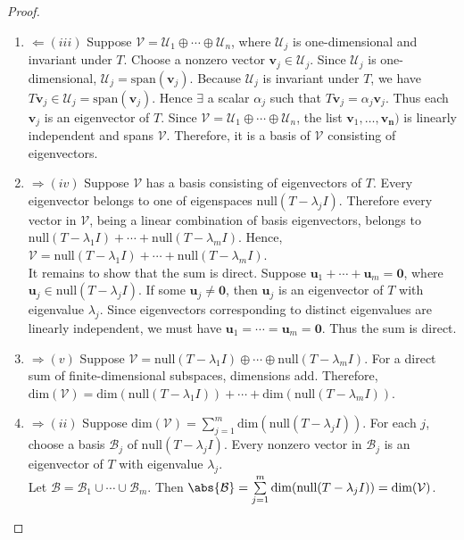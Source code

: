 \begin{proposition}
\begin{proof}
\begin{enumerate}[label=\roman*.]
\item[$(ii)$]$\Leftarrow (iii)$ Suppose $\mathcal{V} = \mathcal{U}_1 \oplus \cdots \oplus \mathcal{U}_n$, where $\mathcal{U}_j$ is one-dimensional and invariant under $T$. Choose a nonzero vector $\mathbf{v}_j \in \mathcal{U}_j$. Since $\mathcal{U}_j$ is one-dimensional, $\mathcal{U}_j = \text{span}(\mathbf{v}_j)$. Because $\mathcal{U}_j$ is invariant under $T$, we have $T \mathbf{v}_j \in \mathcal{U}_j = \text{span}(\mathbf{v}_j)$. Hence $\exists$ a scalar $\alpha_j$ such that $T \mathbf{v}_j = \alpha_j \mathbf{v}_j$. Thus each $\mathbf{v}_j$ is an eigenvector of $T$. Since $\mathcal{V} = \mathcal{U}_1 \oplus \cdots \oplus \mathcal{U}_n$, the list $\mathbf{v}_1, \ldots, \mathbf{v_n})$ is linearly independent and spans $\mathcal{V}$. Therefore, it is a basis of $\mathcal{V}$ consisting of eigenvectors.
\item[$(ii)$]$\Rightarrow (iv)$ Suppose $\mathcal{V}$ has a basis consisting of eigenvectors of $T$. Every eigenvector belongs to one of eigenspaces $\text{null}(T - \lambda_j I)$. Therefore every vector in $\mathcal{V}$, being a linear combination of basis eigenvectors, belongs to $\text{null}(T - \lambda_1 I) + \cdots + \text{null}(T - \lambda_m I)$. Hence, $\mathcal{V} = \text{null}(T - \lambda_1 I) + \cdots + \text{null}(T - \lambda_m I)$.\\
It remains to show that the sum is direct. Suppose $\mathbf{u}_1 + \cdots + \mathbf{u}_m = \mathbf{0}$, where $\mathbf{u}_j \in \text{null}(T - \lambda_j I)$. If some $\mathbf{u}_j \neq \mathbf{0}$, then $\mathbf{u}_j$ is an eigenvector of $T$ with eigenvalue $\lambda_j$. Since eigenvectors corresponding to distinct eigenvalues are linearly independent, we must have $\mathbf{u}_1 = \cdots = \mathbf{u}_m = \mathbf{0}$. Thus the sum is direct.
\item[$(iv)$]$\Rightarrow (v)$ Suppose $\mathcal{V} = \text{null}(T - \lambda_1 I) \oplus \cdots \oplus \text{null}(T - \lambda_m I)$. For a direct sum of finite-dimensional subspaces, dimensions add. Therefore, $\text{dim}(\mathcal{V}) = \text{dim}(\text{null}(T - \lambda_1 I)) + \cdots + \text{dim}(\text{null}(T - \lambda_m I))$.
\item[$(v)$]$\Rightarrow (ii)$ Suppose $\text{dim}(\mathcal{V}) = \sum\limits_{j=1}^m \text{dim}(\text{null}(T - \lambda_j I))$. For each $j$, choose a basis $\mathcal{B}_j$ of $\text{null}(T - \lambda_j I)$. Every nonzero vector in $\mathcal{B}_j$ is an eigenvector of $T$ with eigenvalue $\lambda_j$.\\
Let $\mathcal{B} = \mathcal{B}_1 \cup \cdots \cup \mathcal{B}_m$. Then $\abs{\mathcal{B}} = \sum\limits_{j=1}^m \text{dim}(\text{null}(T - \lambda_j I)) = \text{dim}(\mathcal{V})$.\\

\end{enumerate}
\end{proof}
\end{proposition}
